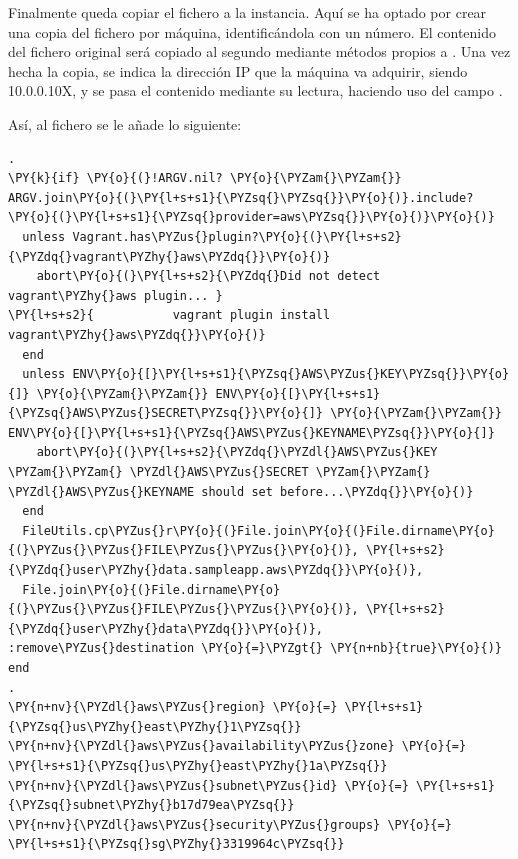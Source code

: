 Finalmente queda copiar el fichero  a la instancia. Aquí se ha optado por crear una copia del fichero  por máquina, identificándola con un número. El contenido del fichero original será copiado al segundo mediante métodos propios a . Una vez hecha la copia, se indica la dirección IP que la máquina va adquirir, siendo 10.0.0.10X, y se pasa el contenido mediante su lectura, haciendo uso del campo .

Así, al fichero  se le añade lo siguiente:

\begin{codelisting}
\label{code:vagrantfile2}
\begin{Verbatim}[fontsize=\relsize{-2.5},fontseries=b,commandchars=\\\{\}]
.
\PY{k}{if} \PY{o}{(}!ARGV.nil? \PY{o}{\PYZam{}\PYZam{}} ARGV.join\PY{o}{(}\PY{l+s+s1}{\PYZsq{}\PYZsq{}}\PY{o}{)}.include?\PY{o}{(}\PY{l+s+s1}{\PYZsq{}provider=aws\PYZsq{}}\PY{o}{)}\PY{o}{)}
  unless Vagrant.has\PYZus{}plugin?\PY{o}{(}\PY{l+s+s2}{\PYZdq{}vagrant\PYZhy{}aws\PYZdq{}}\PY{o}{)} 
    abort\PY{o}{(}\PY{l+s+s2}{\PYZdq{}Did not detect vagrant\PYZhy{}aws plugin... }
\PY{l+s+s2}{           vagrant plugin install vagrant\PYZhy{}aws\PYZdq{}}\PY{o}{)}
  end
  unless ENV\PY{o}{[}\PY{l+s+s1}{\PYZsq{}AWS\PYZus{}KEY\PYZsq{}}\PY{o}{]} \PY{o}{\PYZam{}\PYZam{}} ENV\PY{o}{[}\PY{l+s+s1}{\PYZsq{}AWS\PYZus{}SECRET\PYZsq{}}\PY{o}{]} \PY{o}{\PYZam{}\PYZam{}} ENV\PY{o}{[}\PY{l+s+s1}{\PYZsq{}AWS\PYZus{}KEYNAME\PYZsq{}}\PY{o}{]}
    abort\PY{o}{(}\PY{l+s+s2}{\PYZdq{}\PYZdl{}AWS\PYZus{}KEY \PYZam{}\PYZam{} \PYZdl{}AWS\PYZus{}SECRET \PYZam{}\PYZam{} \PYZdl{}AWS\PYZus{}KEYNAME should set before...\PYZdq{}}\PY{o}{)}
  end
  FileUtils.cp\PYZus{}r\PY{o}{(}File.join\PY{o}{(}File.dirname\PY{o}{(}\PYZus{}\PYZus{}FILE\PYZus{}\PYZus{}\PY{o}{)}, \PY{l+s+s2}{\PYZdq{}user\PYZhy{}data.sampleapp.aws\PYZdq{}}\PY{o}{)}, 
  File.join\PY{o}{(}File.dirname\PY{o}{(}\PYZus{}\PYZus{}FILE\PYZus{}\PYZus{}\PY{o}{)}, \PY{l+s+s2}{\PYZdq{}user\PYZhy{}data\PYZdq{}}\PY{o}{)}, :remove\PYZus{}destination \PY{o}{=}\PYZgt{} \PY{n+nb}{true}\PY{o}{)}
end
.
\PY{n+nv}{\PYZdl{}aws\PYZus{}region} \PY{o}{=} \PY{l+s+s1}{\PYZsq{}us\PYZhy{}east\PYZhy{}1\PYZsq{}}
\PY{n+nv}{\PYZdl{}aws\PYZus{}availability\PYZus{}zone} \PY{o}{=} \PY{l+s+s1}{\PYZsq{}us\PYZhy{}east\PYZhy{}1a\PYZsq{}}
\PY{n+nv}{\PYZdl{}aws\PYZus{}subnet\PYZus{}id} \PY{o}{=} \PY{l+s+s1}{\PYZsq{}subnet\PYZhy{}b17d79ea\PYZsq{}}
\PY{n+nv}{\PYZdl{}aws\PYZus{}security\PYZus{}groups} \PY{o}{=} \PY{l+s+s1}{\PYZsq{}sg\PYZhy{}3319964c\PYZsq{}}

\end{Verbatim}
\end{codelisting}
